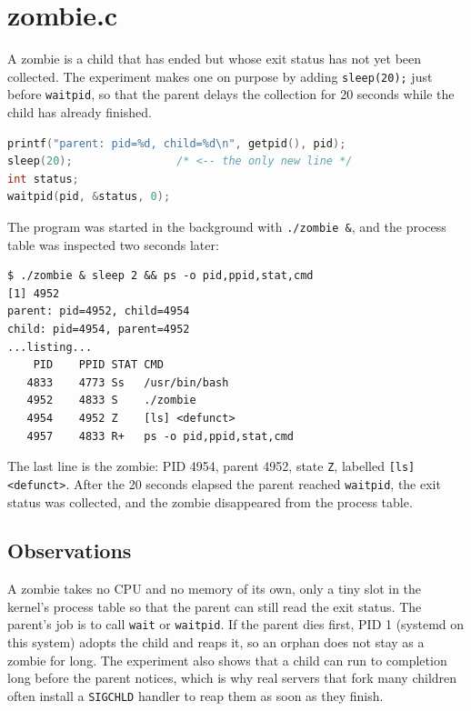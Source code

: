 \documentclass[12pt,a4paper]{article}
\begin{document}
\section{zombie.c}

A zombie is a child that has ended but whose exit status has not yet been collected. The experiment makes one on purpose by adding \texttt{sleep(20);} just before \texttt{waitpid}, so that the parent delays the collection for 20 seconds while the child has already finished.

\begin{lstlisting}[language=C]
printf("parent: pid=%d, child=%d\n", getpid(), pid);
sleep(20);                /* <-- the only new line */
int status;
waitpid(pid, &status, 0);
\end{lstlisting}

The program was started in the background with \texttt{./zombie \&}, and the process table was inspected two seconds later:

\begin{lstlisting}
$ ./zombie & sleep 2 && ps -o pid,ppid,stat,cmd
[1] 4952
parent: pid=4952, child=4954
child: pid=4954, parent=4952
...listing...
    PID    PPID STAT CMD
   4833    4773 Ss   /usr/bin/bash
   4952    4833 S    ./zombie
   4954    4952 Z    [ls] <defunct>
   4957    4833 R+   ps -o pid,ppid,stat,cmd
\end{lstlisting}

The last line is the zombie: PID 4954, parent 4952, state \texttt{Z}, labelled \texttt{[ls] <defunct>}. After the 20 seconds elapsed the parent reached \texttt{waitpid}, the exit status was collected, and the zombie disappeared from the process table.

\subsection{Observations}

A zombie takes no CPU and no memory of its own, only a tiny slot in the kernel's process table so that the parent can still read the exit status. The parent's job is to call \texttt{wait} or \texttt{waitpid}. If the parent dies first, PID 1 (systemd on this system) adopts the child and reaps it, so an orphan does not stay as a zombie for long. The experiment also shows that a child can run to completion long before the parent notices, which is why real servers that fork many children often install a \texttt{SIGCHLD} handler to reap them as soon as they finish.
\end{document}

